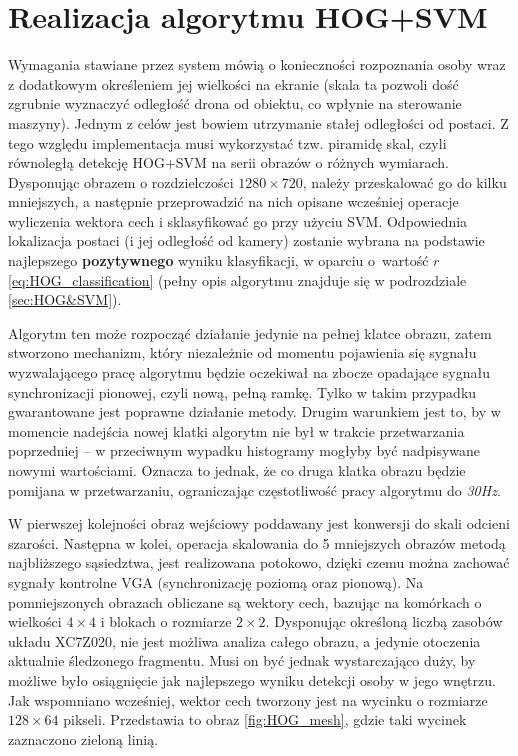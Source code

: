 \section{Realizacja algorytmu HOG+SVM}
\label{HOG_SVM_realization}
Wymagania stawiane przez system mówią o konieczności rozpoznania osoby wraz z dodatkowym określeniem jej wielkości na ekranie (skala ta pozwoli dość zgrubnie wyznaczyć odległość drona od obiektu, co wpłynie na sterowanie maszyny). 
Jednym z celów jest bowiem utrzymanie stałej odległości od postaci.
Z tego względu implementacja musi wykorzystać tzw. piramidę skal, czyli równoległą detekcję HOG+SVM na serii obrazów o różnych wymiarach.
Dysponując obrazem o rozdzielczości $1280 \times720$, należy przeskalować go do kilku mniejszych, a następnie przeprowadzić na nich opisane wcześniej operacje wyliczenia wektora cech i sklasyfikować go przy użyciu SVM. 
Odpowiednia lokalizacja postaci (i jej odległość od kamery) zostanie wybrana na podstawie najlepszego \textbf{pozytywnego} wyniku klasyfikacji, w oparciu o~wartość $r$ \eqref{eq:HOG_classification} (pełny opis algorytmu znajduje się w podrozdziale \ref{sec:HOG&SVM}).

Algorytm ten może rozpocząć działanie jedynie na pełnej klatce obrazu, zatem stworzono mechanizm, który niezależnie od momentu pojawienia się sygnału wyzwalającego pracę algorytmu będzie oczekiwał na zbocze opadające sygnału synchronizacji pionowej, czyli nową, pełną ramkę. 
Tylko w takim przypadku gwarantowane jest poprawne działanie metody.
Drugim warunkiem jest to, by w momencie nadejścia nowej klatki algorytm nie był w trakcie przetwarzania poprzedniej -- w przeciwnym wypadku histogramy mogłyby być nadpisywane nowymi wartościami. 
Oznacza to jednak, że co druga klatka obrazu będzie pomijana w przetwarzaniu, ograniczając częstotliwość pracy algorytmu do \textit{30Hz}.

W pierwszej kolejności obraz wejściowy poddawany jest konwersji do skali odcieni szarości. 
Następna w kolei, operacja skalowania do 5 mniejszych obrazów metodą najbliższego sąsiedztwa, jest realizowana potokowo, dzięki czemu można zachować sygnały kontrolne VGA (synchronizację poziomą oraz pionową).
Na pomniejszonych obrazach obliczane są wektory cech, bazując na komórkach o wielkości $4\times 4$ i blokach o rozmiarze $2\times2$. 
Dysponując określoną liczbą zasobów układu XC7Z020, nie jest możliwa analiza całego obrazu, a jedynie otoczenia aktualnie śledzonego fragmentu.
Musi on być jednak wystarczająco duży, by możliwe było osiągnięcie jak najlepszego wyniku detekcji osoby w jego wnętrzu. %
Jak wspomniano wcześniej, wektor cech tworzony jest na wycinku o rozmiarze $128\times 64$ pikseli. 
Przedstawia to obraz \ref{fig:HOG_mesh}, gdzie taki wycinek zaznaczono zieloną linią. 

